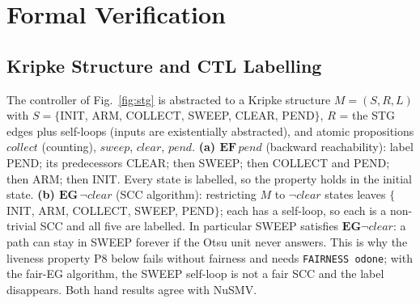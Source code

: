 \documentclass[11pt,a4paper]{article}
\begin{document}
\section{Formal Verification}
\label{sec:formal}
\subsection{Kripke Structure and CTL Labelling}
The controller of Fig.~\ref{fig:stg} is abstracted to a Kripke structure $M=(S,R,L)$ with $S=\{$INIT, ARM, COLLECT, SWEEP,
CLEAR, PEND$\}$, $R$ = the STG edges plus self-loops (inputs are existentially abstracted), and atomic propositions
$\mathit{collect}$ (counting), $\mathit{sweep}$, $\mathit{clear}$, $\mathit{pend}$. \textbf{(a) $\mathbf{EF}\,\mathit{pend}$}
(backward reachability): label PEND; its predecessors CLEAR; then SWEEP; then COLLECT and PEND; then ARM; then INIT. Every state is
labelled, so the property holds in the initial state. \textbf{(b) $\mathbf{EG}\,\neg\mathit{clear}$} (SCC algorithm): restricting $M$ to
$\neg\mathit{clear}$ states leaves $\{$INIT, ARM, COLLECT, SWEEP, PEND$\}$; each has a self-loop, so each is a non-trivial SCC and
all five are labelled. In particular SWEEP satisfies $\mathbf{EG}\neg\mathit{clear}$: a path can stay in SWEEP forever if the Otsu
unit never answers. This is why the liveness property P8 below fails without fairness and needs \texttt{FAIRNESS odone}; with the
fair-EG algorithm, the SWEEP self-loop is not a fair SCC and the label disappears. Both hand results agree with NuSMV.
\end{document}
